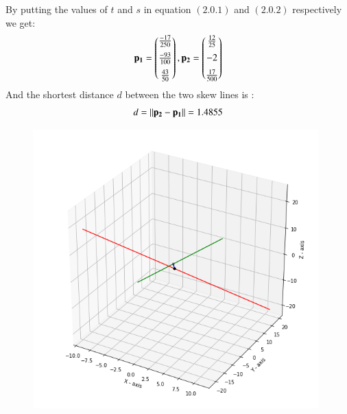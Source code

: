 \documentclass[journal,12pt,twocolumn]{IEEEtran}
\begin{document}
By putting the values of $t$ and $s$ in equation $(2.0.1)$ and $(2.0.2)$ respectively we get:
\begin{align}
    \mathbf{p_1}=\begin{pmatrix}\frac{-17}{250}\\[0.2cm]\frac{-93}{100}\\[0.2cm]\frac{43}{50}\end{pmatrix},\mathbf{p_2}=\begin{pmatrix}\frac{12}{25}\\[0.2cm]-2\\[0.2cm]\frac{17}{500}\end{pmatrix}
\end{align}
And the shortest distance $d$ between the two skew lines is :
$$d=\left\lVert\mathbf{p_2}-\mathbf{p_1}\right\rVert=1.4855$$
\begin{figure}[h]
    \includegraphics[width=11cm]{assignment2.png}
\end{figure}
\end{document}
